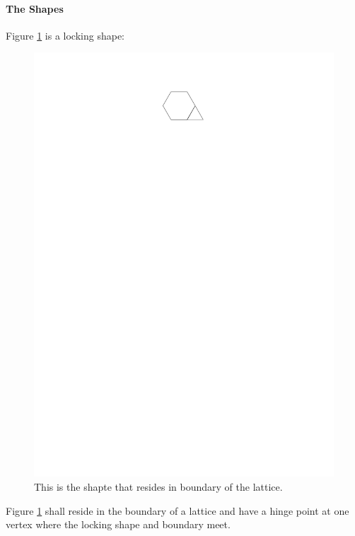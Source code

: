 \paragraph{The Shapes}
Figure \ref{fig:lockingShape} is a locking shape:
\begin{figure}[h]
\begin{center}
\includegraphics{../graphics/lockingShape.pdf}
\caption{This is the shapte that resides in boundary of the lattice.}
\label{fig:lockingShape}
\end{center}
\end{figure}
Figure \ref{fig:lockingShape} shall reside in the boundary of a lattice and have
a hinge point at one vertex where the locking shape and boundary meet.
